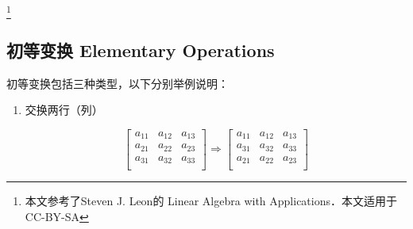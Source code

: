 
\begin{issues}
\issueMissDepend
\end{issues}

\footnote{本文参考了Steven J. Leon的 Linear Algebra with Applications．本文适用于CC-BY-SA}

\subsection{初等变换 Elementary Operations}
初等变换包括三种类型，以下分别举例说明：

\begin{enumerate}
\item 交换两行（列）

\begin{equation}
\left[
    \begin{array}{ccc}
        a_{11} & a_{12} & a_{13}\\
        a_{21} & a_{22} & a_{23}\\
        a_{31} & a_{32} & a_{33}\\
    \end{array}
\right]
\Rightarrow
\left[
    \begin{array}{ccc}
        a_{11} & a_{12} & a_{13}\\
        a_{31} & a_{32} & a_{33}\\
        a_{21} & a_{22} & a_{23}\\
    \end{array}
\right]
\end{equation}


\end{enumerate}
